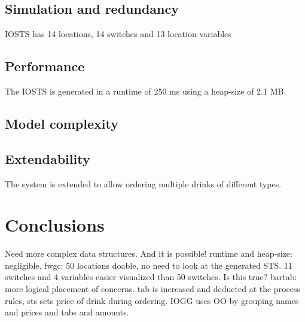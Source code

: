 \subsection{Simulation and redundancy}
IOSTS has 14 locations, 14 switches and 13 location variables

\subsection{Performance}
The IOSTS is generated in a runtime of 250 ms using a heap-size of 2.1 MB.

\subsection{Model complexity}


\subsection{Extendability}
The system is extended to allow ordering multiple drinks of different types.

\begin{comment}
\section{Example 5: communication protocol}
\end{comment}


\section{Conclusions}
Need more complex data structures. And it is possible!
runtime and heap-size: negligible.
fwgc: 50 locations doable, no need to look at the generated STS. 11 switches and 4 variables easier visualized than 50 switches. Is this true?
bartab: more logical placement of concerns. tab is increased and deducted at the process rules, sts sets price of drink during ordering. IOGG uses OO by grouping names and prices and tabs and amounts.
